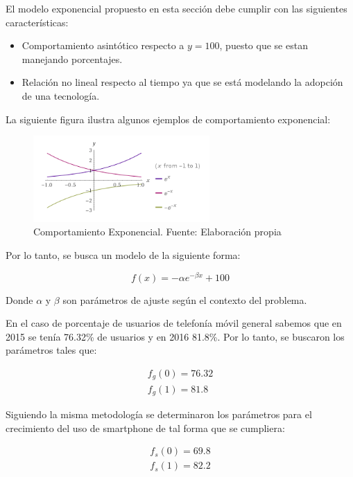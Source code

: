 \documentclass{article}
\begin{document}
El modelo exponencial propuesto en esta sección debe cumplir con las siguientes características:
\begin{itemize}
	\item Comportamiento asintótico respecto a $y=100$, puesto que se estan manejando porcentajes.
	\item Relación no lineal respecto al tiempo ya que se está modelando la adopción de una tecnología.
\end{itemize}

La siguiente figura ilustra algunos ejemplos de comportamiento exponencial:

	\begin{figure}[H]\centering
	\includegraphics[width=0.6\textwidth]{resources/img/modelo_exp.png}
	\caption{\label{fig:exponential_behaviour} Comportamiento Exponencial. Fuente: Elaboración propia}
    \end{figure}

Por lo tanto, se busca un modelo de la siguiente forma:

\begin{equation}
f(x) = -\alpha e^{-\beta x} + 100
\end{equation}

Donde $\alpha$ y $\beta$ son parámetros de ajuste según el contexto del problema.

En el caso de porcentaje de usuarios de telefonía móvil general sabemos que en 2015 se tenía 76.32\% de usuarios y
en 2016 81.8\%. Por lo tanto, se buscaron los parámetros tales que:

\begin{align*}
f_g(0) = 76.32 \\
f_g(1) = 81.8
\end{align*}

Siguiendo la misma metodología se determinaron los parámetros para el crecimiento del uso de smartphone de tal forma
que se cumpliera:

\begin{align*}
f_s(0) = 69.8 \\
f_s(1) = 82.2
\end{align*}
\end{document}
